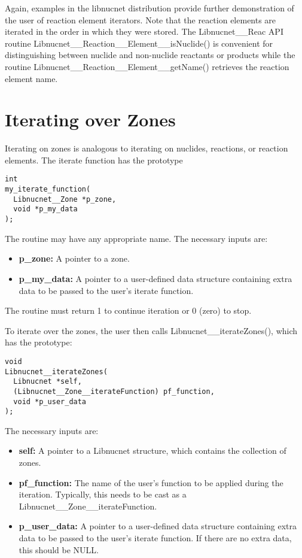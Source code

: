 \documentclass{article}    %
\begin{document}
Again, examples in the libnucnet distribution provide further demonstration of
the user of reaction element iterators.  Note that the reaction elements
are iterated in the order in which they were stored.  The Libnucnet\_\_Reac
API routine Libnucnet\_\_Reaction\_\_Element\_\_isNuclide() is convenient
for distinguishing between nuclide and non-nuclide reactants or products
while the routine Libnucnet\_\_Reaction\_\_Element\_\_getName() retrieves
the reaction element name.

\section{Iterating over Zones} 

Iterating on zones is analogous to iterating on nuclides, reactions, or
reaction elements.  The iterate function has the prototype

\begin{verbatim}
int
my_iterate_function(
  Libnucnet__Zone *p_zone,
  void *p_my_data
);
\end{verbatim}

\noindent
The routine may have any appropriate name.  The necessary inputs are:

\begin{itemize}

\item {\bf p\_zone:}  A pointer to a zone.

\item {\bf p\_my\_data:}  A pointer to a user-defined data structure containing
extra data to be passed to the user's iterate function.

\end{itemize}

\noindent
The routine must return 1 to continue iteration or 0 (zero) to stop.

To iterate over the zones, the user then calls
Libnucnet\_\_iterateZones(), which has the prototype:

\begin{verbatim}
void
Libnucnet__iterateZones(
  Libnucnet *self,
  (Libnucnet__Zone__iterateFunction) pf_function,
  void *p_user_data
);
\end{verbatim}

\noindent
The necessary inputs are:

\begin{itemize}

\item {\bf self:} A pointer to a Libnucnet structure, which contains
the collection of zones.

\item {\bf pf\_function:} The name of the user's function to be applied
during the iteration.
Typically, this needs to be cast as a
Libnucnet\_\_Zone\_\_iterateFunction.

\item {\bf p\_user\_data:}  A pointer to a user-defined data structure
containing extra data to be passed to the user's iterate function.  If there
are no extra data, this should be NULL.

\end{itemize}
\end{document}
